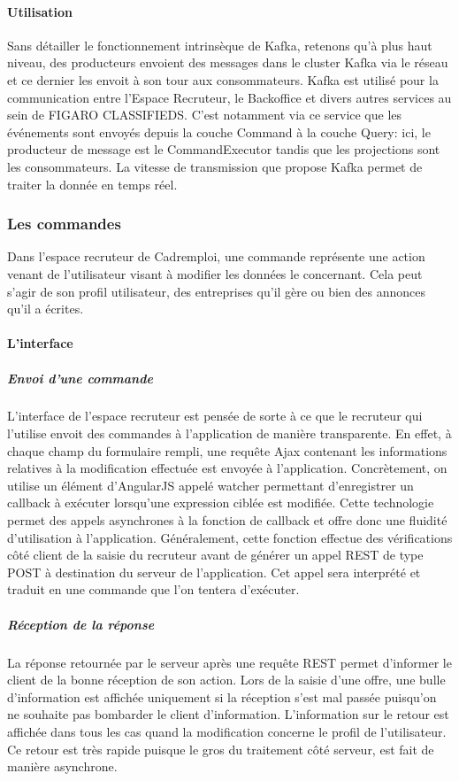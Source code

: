 \paragraph{Utilisation}
\label{par:Utilisation}
Sans détailler le fonctionnement intrinsèque de Kafka, retenons qu'à plus haut niveau, des producteurs envoient des messages dans le cluster Kafka via le réseau et ce dernier les envoit à son tour aux consommateurs.
Kafka est utilisé pour la communication entre l'Espace Recruteur, le Backoffice et divers autres services au sein de FIGARO CLASSIFIEDS.
C'est notamment via ce service que les événements sont envoyés depuis la couche Command à la couche Query: ici, le producteur de message est le CommandExecutor tandis que les projections sont les consommateurs.
La vitesse de transmission que propose Kafka permet de traiter la donnée en temps réel.



\subsubsection{Les commandes}
\label{subs:Les commandes}
Dans l'espace recruteur de Cadremploi, une commande représente une action venant de l'utilisateur visant à modifier les données le concernant.
Cela peut s'agir de son profil utilisateur, des entreprises qu'il gère ou bien des annonces qu'il a écrites.
\paragraph{L'interface}
\label{par:L'interface}
\subparagraph{Envoi d'une commande}
\label{subp:Envoi d'une commande}
L'interface de l'espace recruteur est pensée de sorte à ce que le recruteur qui l'utilise envoit des commandes à l'application de manière transparente.
En effet, à chaque champ du formulaire rempli, une requête Ajax contenant les informations relatives à la modification effectuée est envoyée à l'application.
Concrètement, on utilise un élément d'AngularJS appelé watcher permettant d'enregistrer un callback à exécuter lorsqu'une expression ciblée est modifiée.
Cette technologie permet des appels asynchrones à la fonction de callback et offre donc une fluidité d'utilisation à l'application.
Généralement, cette fonction effectue des vérifications côté client de la saisie du recruteur avant de générer un appel REST de type POST à destination du serveur de l'application.
Cet appel sera interprété et traduit en une commande que l'on tentera d'exécuter.
\subparagraph{Réception de la réponse}
\label{subp:Réception de la réponse}
La réponse retournée par le serveur après une requête REST permet d'informer le client de la bonne réception de son action.
Lors de la saisie d'une offre, une bulle d'information est affichée uniquement si la réception s'est mal passée puisqu'on ne souhaite pas bombarder le client d'information.
L'information sur le retour est affichée dans tous les cas quand la modification concerne le profil de l'utilisateur.
Ce retour est très rapide puisque le gros du traitement côté serveur, est fait de manière asynchrone.

